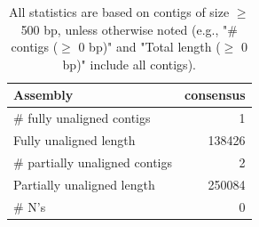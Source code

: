 \documentclass[12pt,a4paper]{article}
\begin{document}
\begin{table}[ht]
\begin{center}
\caption{All statistics are based on contigs of size $\geq$ 500 bp, unless otherwise noted (e.g., "\# contigs ($\geq$ 0 bp)" and "Total length ($\geq$ 0 bp)" include all contigs).}
\begin{tabular}{|l*{1}{|r}|}
\hline
Assembly & consensus \\ \hline
\# fully unaligned contigs & 1 \\ \hline
Fully unaligned length & 138426 \\ \hline
\# partially unaligned contigs & 2 \\ \hline
Partially unaligned length & 250084 \\ \hline
\# N's & 0 \\ \hline
\end{tabular}
\end{center}
\end{table}
\end{document}
